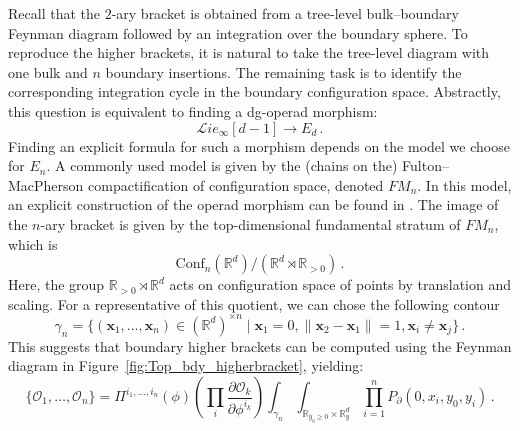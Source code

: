\documentclass[11pt]{article}
\newcommand{\R}{\mathbb{R}}
\numberwithin{equation}{section}
\begin{document}
Recall that the $2$-ary bracket is obtained from a tree-level bulk–boundary Feynman diagram followed by an integration over the boundary sphere. To reproduce the higher brackets, it is natural to take the tree-level diagram with one bulk and $n$ boundary insertions. The remaining task is to identify the corresponding integration cycle in the boundary configuration space. Abstractly, this question is equivalent to finding a dg-operad morphism:
\begin{equation}\label{eq:Linf_to_Ed}
	\mathcal{L}ie_{\infty}[d-1] \to E_d\,.
\end{equation}
Finding an explicit formula for such a morphism depends on the model we choose for $E_n$. A commonly used model is given by the (chains on the) Fulton–MacPherson compactification of configuration space, denoted $FM_n$. In this model, an explicit construction of the operad morphism can be found in \cite{markarian2017weyl}. The image of the $n$-ary bracket is given by the top-dimensional fundamental stratum of $FM_n$, which is
\begin{equation}
	\mathrm{Conf}_{n}(\R^d)/(\R^d\rtimes\R_{>0})\,.
\end{equation}
Here, the group $\R_{>0}\rtimes\R^d$ acts on configuration space of points by translation and scaling. For a representative of this quotient, we can chose the following contour
\begin{equation}
	\gamma_n = \{(\boldsymbol{x}_1,\dots,\boldsymbol{x}_n)\in (\R^d)^{\times n}\mid \boldsymbol{x}_1 = 0,\|\boldsymbol{x}_2 - \boldsymbol{x}_1\| = 1,\boldsymbol{x}_i \neq \boldsymbol{x}_j\}\,.
\end{equation}
This suggests that boundary higher brackets can be computed using the Feynman diagram in Figure~\ref{fig:Top_bdy_higherbracket}, yielding:
\begin{equation}\label{eq:top_higherbracket}
\{\mathcal{O}_1,\dots,\mathcal{O}_n\} = 	\Pi^{i_1,\dots,i_n}(\phi)\left(\prod_{i}\frac{\partial\mathcal{O}_k}{\partial \phi^{i_k}}\right)\int_{\gamma_n}\int_{\R_{y_0\geq 0}\times \R^d_y}\prod_{i = 1}^nP_{\partial}(0,x_i,y_0,y_i)\,.
\end{equation}
\end{document}
